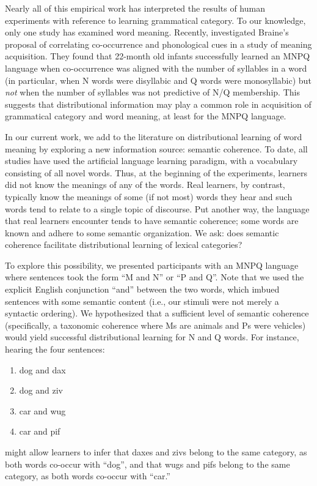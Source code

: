 \documentclass[man,floatsintext]{apa6}
\begin{document}
Nearly all of this empirical work has interpreted the results of human experiments with reference to learning grammatical category. To our knowledge, only one study has examined word meaning. Recently, \citet{lany2010} investigated Braine's proposal of correlating co-occurrence and phonological cues in a study of meaning acquisition. They found that 22-month old infants successfully learned an MNPQ language when co-occurrence was aligned with the number of syllables in a word (in particular, when N words were disyllabic and Q words were monosyllabic) but \emph{not} when the number of syllables was not predictive of N/Q membership. This suggests that distributional information may play a common role in acquisition of grammatical category and word meaning, at least for the MNPQ language. 

In our current work, we add to the literature on distributional learning of word meaning by exploring a new information source: semantic coherence. To date, all studies have used the artificial language learning paradigm, with a vocabulary consisting of all novel words. Thus, at the beginning of the experiments, learners did not know the meanings of any of the words. Real learners, by contrast, typically know the meanings of some (if not most) words they hear and such words tend to relate to a single topic of discourse. Put another way, the language that real learners encounter tends to have semantic coherence; some words are known and adhere to some semantic organization. We ask: does semantic coherence facilitate distributional learning of lexical categories?

To explore this possibility, we presented participants with an MNPQ language where sentences took the form ``M and N'' or ``P and Q''. Note that we used the explicit English conjunction ``and'' between the two words, which imbued sentences with some semantic content (i.e., our stimuli were not merely a syntactic ordering). We hypothesized that a sufficient level of semantic coherence (specifically, a taxonomic coherence where Ms are animals and Ps were vehicles) would yield successful distributional learning for N and Q words. For instance, hearing the four sentences:
\begin{enumerate}
\item dog and dax
\item dog and ziv
\item car and wug
\item car and pif
\end{enumerate} might allow learners to infer that daxes and zivs belong to the same category, as both words co-occur with ``dog'', and that wugs and pifs belong to the same category, as both words co-occur with ``car.''
\end{document}
